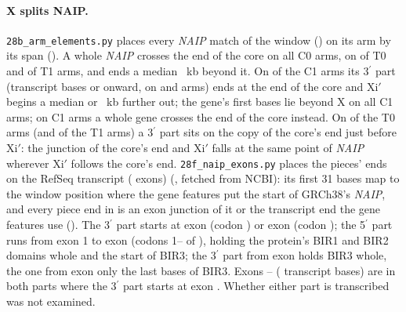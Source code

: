 \paragraph{X splits NAIP.} \texttt{28b\_arm\_elements.py} places every \emph{NAIP} match of the window
() on its arm by its span (). A whole
\emph{NAIP} crosses the end of the core on all \elNaipWholeCZero{} C0 arms, on \elNaipWholeTZero{} of \elTZero{} T0 and
\elNaipWholeTOne{} of \elTOne{} T1 arms, and ends a median \elNaipPast~kb beyond it. On \elNaipSplit{} of the
\elCOne{} C1 arms its 3$^\prime$ part (transcript bases \elNaipStartA{} or \elNaipStartB{} onward, on \elNaipFromA{} and
\elNaipFromB{} arms) ends at the end of the core and Xi$'$ begins a median \elNaipGapA{} or \elNaipGapB~kb further out;
the gene's first \elNaipTxB{} bases lie beyond X on all \elNaipFive{} C1 arms; on \elNaipWholeCOne{} C1 arms a whole gene crosses the end of the core instead. On \elNaipTZeroThree{} of the \elTZero{} T0 arms (and \elNaipTOneThree{} of the \elTOne{} T1 arms) a
3$^\prime$ part sits on the copy of the core's end just before Xi$'$: the junction of the core's end and Xi$'$ falls at the
same point of \emph{NAIP} wherever Xi$'$ follows the core's end. \texttt{28f\_naip\_exons.py} places the pieces' ends on the RefSeq transcript \nxTx{} (\nxExons{} exons)
(, fetched from NCBI): its first 31 bases map to the window position where the gene
features put the start of GRCh38's \emph{NAIP}, and every piece end in  is an exon junction of it
or the transcript end the gene features use (). The 3$^\prime$ part starts at exon
\nxThreeAExon{} (codon \nxThreeACodon) or exon \nxThreeBExon{} (codon \nxThreeBCodon); the 5$^\prime$ part runs from exon 1
to exon \nxFiveExon{} (codons 1--\nxFiveCodon{} of \nxCodons), holding the protein's BIR1 and BIR2 domains whole and the start of BIR3;
the 3$^\prime$ part from exon \nxThreeAExon{} holds BIR3 whole, the one from exon \nxThreeBExon{} only the last bases of BIR3. Exons
\nxThreeAExon--\nxFiveExon{} (\elNaipOverlap{} transcript bases) are in both parts where the 3$^\prime$ part starts at exon \nxThreeAExon.
Whether either part is transcribed was not examined.


